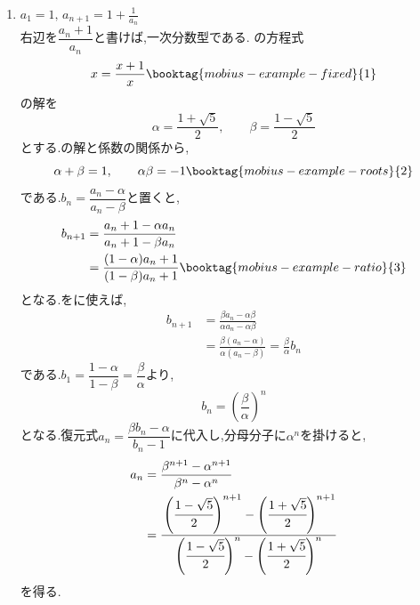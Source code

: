 \begin{enumerate}[label=(\arabic*),parsep=3pt,format=\bookitemlink{example-mobius-1}{solution}{problem}]
            の方程式$x=\dfrac{4x-9}{x-2}$は重解$3$を持つ.
            $b_n=a_n-3$と置くと,
            \begin{align*}
              b_{n+1}&=\frac{4a_n-9}{a_n-2}-3
                =\frac{a_n-3}{a_n-2}\\
              &=\frac{b_n}{b_n+1},\quad b_1=2
            \end{align*}
            となる.正の$b_n$が続くので,$b_n$も元の分母$b_n+1$も零でない.
            逆数を取れば,
            \begin{align*}
              \frac1{b_{n+1}}&=\frac1{b_n}+1,\\
              \frac1{b_n}&=\frac12+(n-1)=\frac{2n-1}{2}
            \end{align*}
            である.従って,
            \[
              a_n=3+b_n=3+\frac2{2n-1}=\frac{6n-1}{2n-1}
            \]
            を得る.
      \item $\displaystyle a_1=1,\, a_{n+1}=1+\frac1{a_n}$\\
            右辺を$\dfrac{a_n+1}{a_n}$と書けば,一次分数型である.
            の方程式
            \[
              x=\frac{x+1}{x}\booktag{mobius-example-fixed}{1}
            \]
            の解を
            \[
              \alpha=\frac{1+\sqrt5}{2},\qquad
              \beta=\frac{1-\sqrt5}{2}
            \]
            とする.の解と係数の関係から,
            \[
              \alpha+\beta=1,\qquad \alpha\beta=-1
                \booktag{mobius-example-roots}{2}
            \]
            である.$b_n=\dfrac{a_n-\alpha}{a_n-\beta}$と置くと,
            \begin{align*}
              b_{n+1}&=\frac{a_n+1-\alpha a_n}{a_n+1-\beta a_n}\\
              &=\frac{(1-\alpha)a_n+1}{(1-\beta)a_n+1}
                \booktag{mobius-example-ratio}{3}
            \end{align*}
            となる.をに使えば,
            \begin{align*}
              b_{n+1}&=\frac{\beta a_n-\alpha\beta}{\alpha a_n-\alpha\beta}\\
              &=\frac{\beta(a_n-\alpha)}{\alpha(a_n-\beta)}
                =\frac\beta\alpha b_n
            \end{align*}
            である.$b_1=\dfrac{1-\alpha}{1-\beta}=\dfrac{\beta}{\alpha}$より,
            \[
              b_n=\left(\frac\beta\alpha\right)^n
            \]
            となる.復元式$a_n=\dfrac{\beta b_n-\alpha}{b_n-1}$に代入し,分母分子に$\alpha^n$を掛けると,
            \begin{align*}
              a_n&=\frac{\beta^{n+1}-\alpha^{n+1}}{\beta^n-\alpha^n}\\
              &=\cfrac{\left(\cfrac{1-\sqrt5}{2}\right)^{n+1}-\left(\cfrac{1+\sqrt5}{2}\right)^{n+1}}
                {\left(\cfrac{1-\sqrt5}{2}\right)^n-\left(\cfrac{1+\sqrt5}{2}\right)^n}
            \end{align*}
            を得る.
    \end{enumerate}
